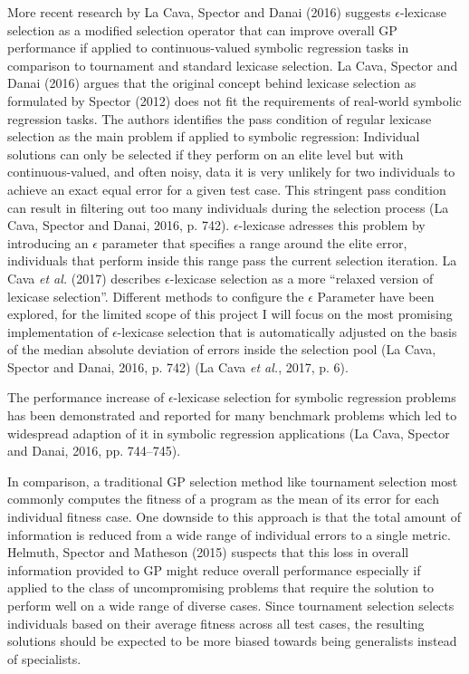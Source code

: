 \documentclass[
  12pt,
]{article}
\begin{document}
More recent research by La Cava, Spector and Danai (2016) suggests
\(\epsilon\)-lexicase selection as a modified selection operator that
can improve overall GP performance if applied to continuous-valued
symbolic regression tasks in comparison to tournament and standard
lexicase selection. La Cava, Spector and Danai (2016) argues that the
original concept behind lexicase selection as formulated by Spector
(2012) does not fit the requirements of real-world symbolic regression
tasks. The authors identifies the pass condition of regular lexicase
selection as the main problem if applied to symbolic regression:
Individual solutions can only be selected if they perform on an elite
level but with continuous-valued, and often noisy, data it is very
unlikely for two individuals to achieve an exact equal error for a given
test case. This stringent pass condition can result in filtering out too
many individuals during the selection process (La Cava, Spector and
Danai, 2016, p. 742). \(\epsilon\)-lexicase adresses this problem by
introducing an \(\epsilon\) parameter that specifies a range around the
elite error, individuals that perform inside this range pass the current
selection iteration. La Cava \emph{et al.} (2017) describes
\(\epsilon\)-lexicase selection as a more ``relaxed version of lexicase
selection''. Different methods to configure the \(\epsilon\) Parameter
have been explored, for the limited scope of this project I will focus
on the most promising implementation of \(\epsilon\)-lexicase selection
that is automatically adjusted on the basis of the median absolute
deviation of errors inside the selection pool (La Cava, Spector and
Danai, 2016, p. 742) (La Cava \emph{et al.}, 2017, p. 6).

The performance increase of \(\epsilon\)-lexicase selection for symbolic
regression problems has been demonstrated and reported for many
benchmark problems which led to widespread adaption of it in symbolic
regression applications (La Cava, Spector and Danai, 2016, pp.
744--745).

In comparison, a traditional GP selection method like tournament
selection most commonly computes the fitness of a program as the mean of
its error for each individual fitness case. One downside to this
approach is that the total amount of information is reduced from a wide
range of individual errors to a single metric. Helmuth, Spector and
Matheson (2015) suspects that this loss in overall information provided
to GP might reduce overall performance especially if applied to the
class of uncompromising problems that require the solution to perform
well on a wide range of diverse cases. Since tournament selection
selects individuals based on their average fitness across all test
cases, the resulting solutions should be expected to be more biased
towards being generalists instead of specialists.
\end{document}
